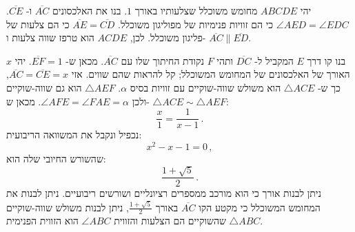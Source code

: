 \documentclass[11pt,a4paper]{article}
\newcommand*{\disfrac}[2]{\displaystyle\frac{#1}{#2}}
\begin{document}
יהי
$ABCDE$ 
מחומש משוכלל שצלעותיו באורך
$1$. 
בנו את האלכסונים
$\overline{AC}$
ו-%
$\overline{CE}$.
$\angle AED=\angle EDC$
כי הם זוויות פנימיות של מפוליגון משוכלל. 
$\overline{AE}=\overline{CD}$
כי הם צלעות של פליגון משוכלל. לכן, 
$ACDE$
הוא טרפז שווה צלעות ו-%
$\overline{AC}\parallel \overline{ED}$.
\begin{center}
\end{center}
בנו קו דרך 
$E$
המקביל ל-%
$\overline{DC}$
ותהי
$F$
נקודת החיתוך שלו עם
$\overline{AC}$.
מכאן ש-%
$\overline{EF}=1$.
יהי
$x$
האורך של האלכסונים של המחומש המשוכלל; 
קל להראות שהם שווים. אזי
$\overline{AC}=\overline{CE}=x$,
כך ש-%
$\triangle ACE$ 
הוא משולש שווה-שוקיים עם זוויות בסיס
$\alpha$. $\triangle AEF$
הוא גם שווה-שוקיים ולכן
$\angle AFE=\angle FAE=\alpha$.
מכאן ש-%
$\triangle ACE\sim\triangle AEF$:
\[
\disfrac{x}{1}=\disfrac{1}{x-1}\,.
\]
נכפיל ונקבל את המשוואה הריבועית:
\[
x^2-x-1=0\,,
\]
שהשורש החיובי שלה הוא:
\[
\disfrac{1+\sqrt{5}}{2}\,.
\]
ניתן לבנות אורך כי הוא מורכב ממספרים רציונליים ושורשים ריבועיים. ניתן לבנות את המחומש המשוכלל כי מקטע הקו
$\overline{AC}$
באורך
$\frac{1+\sqrt{5}}{2}$,
ניתן לבנות משולש שווה-שוקיים
$\triangle ABC$
שהשוקיים הם הצלעות והזווית
$\angle ABC$
הוא הזווית הפנימית.




\end{document}

